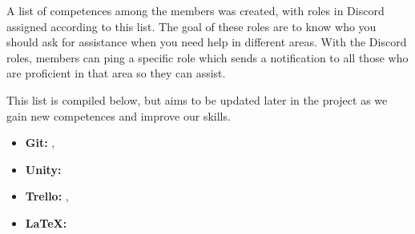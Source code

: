 A list of competences among the members was created, with roles in Discord assigned according to this list. The goal of these roles are to know who you should ask for assistance when you need help in different areas. With the Discord roles, members can ping a specific role which sends a notification to all those who are proficient in that area so they can assist.

This list is compiled below, but aims to be updated later in the project as we gain new competences and improve our skills.

\begin{itemize}
    \item \textbf{Git:} \marcus,  \hannes
    \item \textbf{Unity:} \felix
    \item \textbf{Trello:} \felix,  \marcus
    \item \textbf{LaTeX:} \marcus
\end{itemize}
